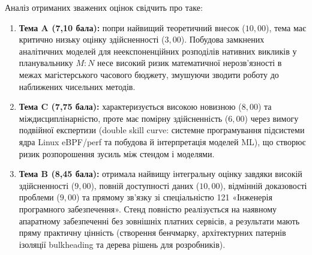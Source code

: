 Аналіз отриманих зважених оцінок свідчить про таке:
\begin{enumerate}[wide]
    \item \textbf{Тема A (7{,}10 бала):} попри найвищий теоретичний внесок ($10{,}00$), тема має критично низьку оцінку здійсненності ($3{,}00$). Побудова замкнених аналітичних моделей для неекспоненційних розподілів нативних викликів у планувальнику $M:N$ несе високий ризик математичної нерозв'язності в межах магістерського часового бюджету, змушуючи зводити роботу до наближених чисельних методів.
    \item \textbf{Тема C (7{,}75 бала):} характеризується високою новизною ($8{,}00$) та міждисциплінарністю, проте має помірну здійсненність ($6{,}00$) через вимогу подвійної експертизи (double skill curve: системне програмування підсистеми ядра Linux eBPF/perf та побудова й інтерпретація моделей ML), що створює ризик розпорошення зусиль між стендом і моделями.
    \item \textbf{Тема B (8{,}45 бала):} отримала найвищу інтегральну оцінку завдяки високій здійсненності ($9{,}00$), повній доступності даних ($10{,}00$), відмінній доказовості проблеми ($9{,}00$) та прямому зв'язку зі спеціальністю 121 «Інженерія програмного забезпечення». Стенд повністю реалізується на наявному апаратному забезпеченні без зовнішніх платних сервісів, а результати мають пряму практичну цінність (створення бенчмарку, архітектурних патернів ізоляції bulkheading та дерева рішень для розробників).
\end{enumerate}
